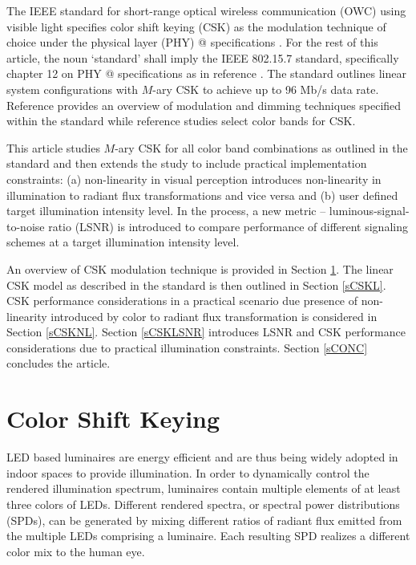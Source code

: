 \documentclass[10pt,letterpaper]{article}
\makeatletter
\newcommand*{\rmnum}[1]{\expandafter\@slowromancap\romannumeral #1@}
\makeatother
\begin{document}
The IEEE standard for short-range optical wireless communication (OWC) using
visible light specifies color shift keying (CSK)
as the modulation technique of choice under the physical layer (PHY)
\rmnum{3} specifications \cite{ieee802.15.7}. For the rest of this article, the noun `standard' shall imply the IEEE 802.15.7 standard, specifically chapter 12 on PHY \rmnum{3} specifications as in reference \cite{ieee802.15.7}. The standard outlines linear system configurations with $M$-ary CSK to achieve up to 96 Mb/s data rate. Reference \cite{raj12a} provides an overview of modulation and dimming techniques specified within the standard while reference \cite{sin13a} studies select color bands for CSK.

This article studies $M$-ary CSK for all color band combinations as
outlined in the standard and then extends the study to include
practical implementation constraints: (a) non-linearity in visual perception introduces non-linearity in illumination to radiant flux transformations and vice versa and (b) user
defined target illumination intensity level. In the process, a new
metric -- luminous-signal-to-noise ratio (LSNR) is introduced to
compare performance of different signaling schemes at a target
illumination intensity level.

An overview of CSK modulation technique is provided in
Section \ref{sCSK}. The linear CSK model as described in the standard is then outlined in Section \ref{sCSKL}. CSK performance considerations in a practical scenario due presence of non-linearity introduced by color to radiant flux transformation is
considered in Section \ref{sCSKNL}. Section \ref{sCSKLSNR} introduces
LSNR and CSK performance considerations due to practical illumination
constraints. Section \ref{sCONC} concludes the article.

\section{Color Shift Keying}\label{sCSK}
LED based luminaires are energy efficient and are thus being widely
adopted in indoor spaces to provide illumination. In order to
dynamically control the rendered illumination spectrum, luminaires
contain multiple elements of at least three colors of LEDs. Different
rendered spectra, or spectral power distributions (SPDs), can be
generated by mixing different ratios of radiant flux emitted from the
multiple LEDs comprising a luminaire. Each resulting SPD realizes
a different color mix to the human eye.
\end{document}
